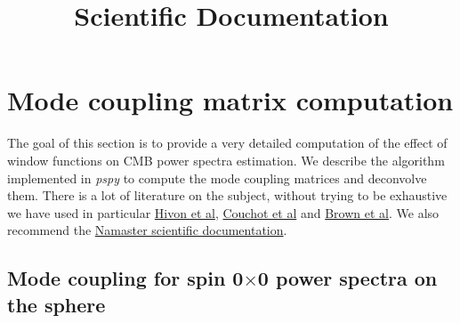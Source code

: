\documentclass[a4paper, 11pt]{article}
\begin{document}
\title{\textbf{Scientific Documentation}}
\maketitle




\section{Mode coupling matrix computation}

The goal of this section is to provide a very detailed computation of the effect of window functions on CMB power spectra estimation. We describe the algorithm implemented in {\it pspy} to compute the mode coupling matrices and deconvolve them. There is a lot of literature on the subject, without trying to be exhaustive we have used in particular  \href{https://arxiv.org/pdf/astro-ph/0105302.pdf}{Hivon et al}, \href{https://arxiv.org/abs/1609.09730}{Couchot et al} and \href{https://arxiv.org/abs/astro-ph/0410394}{Brown et al}. We also recommend the \href{https://github.com/LSSTDESC/NaMaster/blob/master/doc/doc_scientific.pdf}{Namaster scientific documentation}. 

\subsection{Mode coupling for spin 0$\times$0 power spectra on the sphere}
\end{document}
